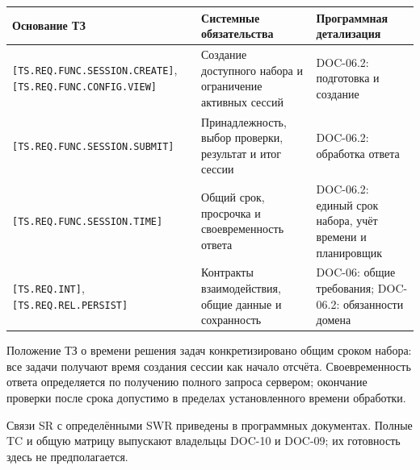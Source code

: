 \documentclass[12pt,a4paper]{article}
\begin{document}
{\def\LTcaptype{none} %
\begin{longtable}[]{@{}
  >{\raggedright\arraybackslash}p{}
  >{\raggedright\arraybackslash}p{}
  >{\raggedright\arraybackslash}p{}@{}}
\toprule\noalign{}
\begin{minipage}[b]{\linewidth}\raggedright
Основание ТЗ
\end{minipage} & \begin{minipage}[b]{\linewidth}\raggedright
Системные обязательства
\end{minipage} & \begin{minipage}[b]{\linewidth}\raggedright
Программная детализация
\end{minipage} \\
\midrule\noalign{}
\endhead
\bottomrule\noalign{}
\endlastfoot
\texttt{[TS.\allowbreak{}REQ.\allowbreak{}FUNC.\allowbreak{}SESSION.\allowbreak{}CREATE]}, \texttt{[TS.\allowbreak{}REQ.\allowbreak{}FUNC.\allowbreak{}CONFIG.\allowbreak{}VIEW]} & Создание доступного набора и ограничение активных сессий & DOC-06.2: подготовка и создание \\
\texttt{[TS.\allowbreak{}REQ.\allowbreak{}FUNC.\allowbreak{}SESSION.\allowbreak{}SUBMIT]} & Принадлежность, выбор проверки, результат и итог сессии & DOC-06.2: обработка ответа \\
\texttt{[TS.\allowbreak{}REQ.\allowbreak{}FUNC.\allowbreak{}SESSION.\allowbreak{}TIME]} & Общий срок, просрочка и своевременность ответа & DOC-06.2: единый срок набора, учёт времени и планировщик \\
\texttt{{[}TS.REQ.INT{]}}, \texttt{[TS.\allowbreak{}REQ.\allowbreak{}REL.\allowbreak{}PERSIST]} & Контракты взаимодействия, общие данные и сохранность & DOC-06: общие требования; DOC-06.2: обязанности домена \\
\end{longtable}
}

Положение ТЗ о времени решения задач конкретизировано общим сроком набора: все задачи получают время создания сессии как начало отсчёта. Своевременность ответа определяется по получению полного запроса сервером; окончание проверки после срока допустимо в пределах установленного времени обработки.

Связи SR с определёнными SWR приведены в программных документах. Полные TC и общую матрицу выпускают владельцы DOC-10 и DOC-09; их готовность здесь не предполагается.
\end{document}
